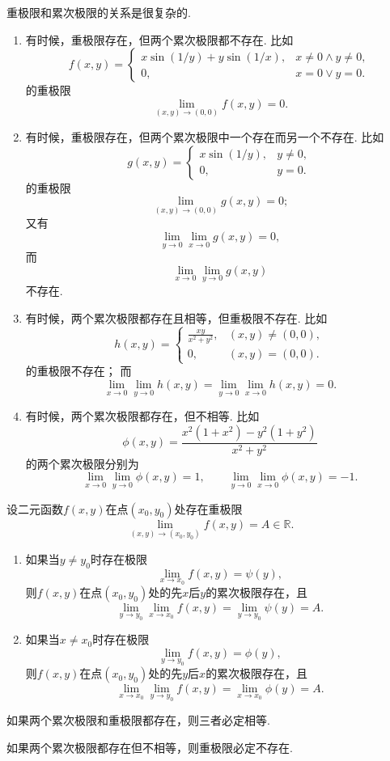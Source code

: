 \begin{example}
重极限和累次极限的关系是很复杂的.
\begin{enumerate}
	\item 有时候，重极限存在，但两个累次极限都不存在.
	比如\[
		f(x,y) = \left\{ \begin{array}{cl}
			x \sin(1/y) + y \sin(1/x), & x\neq0 \land y\neq0, \\
			0, & x=0 \lor y=0.
		\end{array} \right.
	\]的重极限\[
		\lim_{(x,y)\to(0,0)} f(x,y) = 0.
	\]

	\item 有时候，重极限存在，但两个累次极限中一个存在而另一个不存在.
	比如\[
		g(x,y) = \left\{ \begin{array}{cl}
			x \sin(1/y), & y\neq0, \\
			0, & y=0.
		\end{array} \right.
	\]的重极限\[
		\lim_{(x,y)\to(0,0)} g(x,y) = 0;
	\]
	又有\[
		\lim_{y\to0} \lim_{x\to0} g(x,y) = 0,
	\]
	而\[
		\lim_{x\to0} \lim_{y\to0} g(x,y)
	\]不存在.

	\item 有时候，两个累次极限都存在且相等，但重极限不存在.
	比如\[
		h(x,y) = \left\{ \begin{array}{cl}
			\frac{xy}{x^2+y^2}, & (x,y)\neq(0,0), \\
			0, & (x,y)=(0,0).
		\end{array} \right.
	\]的重极限不存在；
	而\[
		\lim_{x\to0} \lim_{y\to0} h(x,y)
		= \lim_{y\to0} \lim_{x\to0} h(x,y) = 0.
	\]

	\item 有时候，两个累次极限都存在，但不相等.
	比如\[
		\phi(x,y) = \frac{x^2(1+x^2) - y^2(1+y^2)}{x^2+y^2}
	\]的两个累次极限分别为\[
		\lim_{x\to0} \lim_{y\to0} \phi(x,y) = 1,
		\qquad
		\lim_{y\to0} \lim_{x\to0} \phi(x,y) = -1.
	\]
\end{enumerate}
\end{example}

\begin{theorem}
设二元函数\(f(x,y)\)在点\((x_0,y_0)\)处存在重极限\[
	\lim_{(x,y)\to(x_0,y_0)} f(x,y) = A \in \mathbb{R}.
\]\begin{enumerate}
	\item 如果当\(y \neq y_0\)时存在极限\[
		\lim_{x \to x_0} f(x,y) = \psi(y),
	\]
	则\(f(x,y)\)在点\((x_0,y_0)\)处的先\(x\)后\(y\)的累次极限存在，且\[
		\lim_{y \to y_0} \lim_{x \to x_0} f(x,y)
		= \lim_{y \to y_0} \psi(y) = A.
	\]

	\item 如果当\(x \neq x_0\)时存在极限\[
		\lim_{y \to y_0} f(x,y) = \phi(y),
	\]
	则\(f(x,y)\)在点\((x_0,y_0)\)处的先\(y\)后\(x\)的累次极限存在，且\[
		\lim_{x \to x_0} \lim_{y \to y_0} f(x,y)
		= \lim_{x \to x_0} \phi(y) = A.
	\]
\end{enumerate}
\end{theorem}

\begin{corollary}
如果两个累次极限和重极限都存在，则三者必定相等.
\end{corollary}

\begin{corollary}
如果两个累次极限都存在但不相等，则重极限必定不存在.
\end{corollary}
